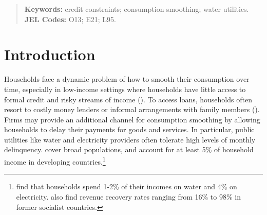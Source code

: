 \documentclass[12pt]{article}
\begin{document}
\begin{titlepage}
\begin{abstract}





	

 
\vspace{.5in}
\textbf{Keywords:} credit constraints; consumption smoothing; water utilities.\\
\textbf{JEL Codes:} O13; E21; L95.\\
\bigskip
\end{abstract}
\setcounter{page}{0}
\thispagestyle{empty}
\end{titlepage}
\pagebreak \newpage



\section{Introduction}



Households face a dynamic problem of how to smooth their consumption over time, especially in low-income settings where households have little access to formal credit and risky streams of income (\cite{morduch1995income}).  To access loans, households often resort to costly money lenders or informal arrangements with family members (\cite{banerjee2007economic}).  Firms may provide an additional channel for consumption smoothing by allowing households to delay their payments for goods and services.  In particular, public utilities like water and electricity providers often tolerate high levels of monthly delinquency.  cover broad populations, and account for at least 5\% of household income in developing countries.\footnote{\cite{komives2006distributional} find that households spend 1-2\% of their incomes on water and 4\% on electricity.  \cite{komives2006distributional} also find revenue recovery rates ranging from 16\% to 98\% in former socialist countries.}  
\end{document}
